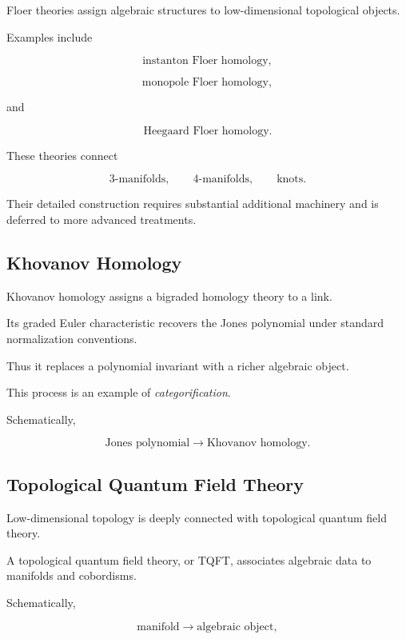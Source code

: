 Floer theories assign algebraic structures to low-dimensional topological
objects.

Examples include

\[
\boxed{
\text{instanton Floer homology},
}
\]

\[
\boxed{
\text{monopole Floer homology},
}
\]

and

\[
\boxed{
\text{Heegaard Floer homology}.
}
\]

These theories connect

\[
3\text{-manifolds},
\qquad
4\text{-manifolds},
\qquad
\text{knots}.
\]

Their detailed construction requires substantial additional machinery and
is deferred to more advanced treatments.

\subsection{Khovanov Homology}
\label{subsec:khovanov-low-dimensional}

Khovanov homology assigns a bigraded homology theory to a link.

Its graded Euler characteristic recovers the Jones polynomial under standard
normalization conventions.

Thus it replaces a polynomial invariant with a richer algebraic object.

This process is an example of \emph{categorification}.

Schematically,

\[
\boxed{
\text{Jones polynomial}
\longrightarrow
\text{Khovanov homology}.
}
\]

\subsection{Topological Quantum Field Theory}
\label{subsec:tqft-low-dimensional}

Low-dimensional topology is deeply connected with topological quantum field
theory.

A topological quantum field theory, or TQFT, associates algebraic data to
manifolds and cobordisms.

Schematically,

\[
\boxed{
\text{manifold}
\longrightarrow
\text{algebraic object},
}
\]


